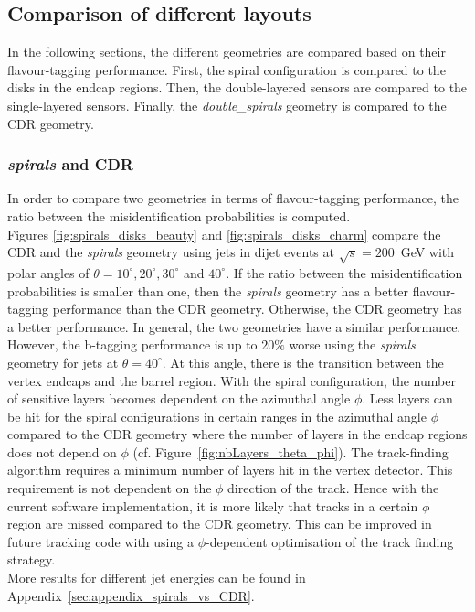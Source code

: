\subsection{Comparison of different layouts}

In the following sections, the different geometries are compared based on their flavour-tagging performance. First, the spiral configuration is compared to the disks in the endcap regions. Then, the double-layered sensors are compared to the single-layered sensors. Finally, the \textit{double\_spirals} geometry is compared to the CDR geometry.



\subsubsection{\emph{spirals} and CDR}\label{sec:spirals_CDR}

In order to compare two geometries in terms of flavour-tagging performance, the ratio between the misidentification probabilities is computed. \\
Figures \ref{fig:spirals_disks_beauty} and \ref{fig:spirals_disks_charm} compare the CDR and the \textit{spirals} geometry using jets in dijet events at $\sqrt{s}=200$~GeV with polar angles of $\theta=10^\circ, 20^\circ, 30^\circ$ and $40^\circ$. If the ratio between the misidentification probabilities is smaller than one, then the \textit{spirals} geometry has a better flavour-tagging performance than the CDR geometry. Otherwise, the CDR geometry has a better performance.
In general, the two geometries have a similar performance. However, the b-tagging performance is up to $20\%$ worse using the \textit{spirals} geometry for jets at $\theta=40^{\circ}$. At this angle, there is the transition between the vertex endcaps and the barrel region. With the spiral configuration, the number of sensitive layers becomes dependent on the azimuthal angle $\phi$. Less layers can be hit for the spiral configurations in certain ranges in the azimuthal angle $\phi$ compared to the CDR geometry where the number of layers in the endcap regions does not depend on $\phi$ (cf. Figure~\ref{fig:nbLayers_theta_phi}). The track-finding algorithm requires a minimum number of layers hit in the vertex detector. This requirement is not dependent on the $\phi$ direction of the track. Hence with the current software implementation, it is more likely that tracks in a certain $\phi$ region are missed compared to the CDR geometry. This can be improved in future tracking code with using a $\phi$-dependent optimisation of the track finding strategy. \\
More results for different jet energies can be found in Appendix~\ref{sec:appendix_spirals_vs_CDR}.

